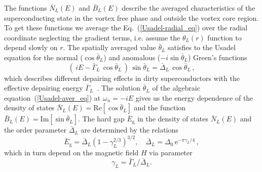 \documentclass[prx,twocolumn,aps,superscriptaddress,showpacs,amsmath,amssymb,footnoteinbib]{revtex4-1}
\begin{document}
The functions $\bar{N}_L(E)$ and $\bar{B}_L(E)$ describe the
averaged characteristics of the superconducting state in the
vortex free phase and outside the vortex core region. To get these
functions we average the Eq.~(\ref{Usadel-radial_eq}) over the
radial coordinate neglecting the gradient terms, i.e. assume the
$\theta_L(r)$ function to depend slowly on $r$. The spatially
averaged value $\bar{\theta}_L$ satisfies to the Usadel equation
for the normal ($\cos\bar{\theta}_L$) and anomalous ($-i
\sin\bar{\theta}_L$) Green's functions~\cite{Maki-SC}
%
\begin{equation}\label{Usadel-aver_eq}
    \left(\,i E - \bar{\Gamma}_L\,\cos\bar{\theta}_L\,
    \right)\,\sin\bar{\theta}_L = \bar{\Delta}_L\, \cos\bar{\theta}_L\,,
\end{equation}
%
which describes different depairing effects in dirty
superconductors with the effective depairing energy
$\bar{\Gamma}_L$~\cite{Anthore-PRL03,eg1,eg2,eg3}. The solution
$\bar{\theta}_L$ of the algebraic equation~(\ref{Usadel-aver_eq})
at $\omega_n = - i E$ gives us the energy dependence of the
density of states $\bar{N}_L(E) = \mathrm{Re}[\cos\bar{\theta}_L]$
and the function $\bar{B}_L(E) = \mathrm{Im}[\sin\bar{\theta}_L]$.
The hard gap $\bar{E}_\mathrm{g}$ in the density of states
$\bar{N}_L(E)$ and the order parameter $\bar{\Delta}_L$ are
determined by the
relations %
%
\begin{equation}\label{Eg-Delta}
    \bar{E}_\mathrm{g} = \bar{\Delta}_L \left( 1 - \gamma_L^{2/3}
    \right)^{3/2}, \quad \bar{\Delta}_L = \Delta_0\, \mathrm{e}^{-\pi \gamma_L
    /4}\,,
\end{equation}
%
which in turn depend on the magnetic field $H$ via parameter
%
\begin{equation}\label{gamma_L}
    \gamma_L = \bar{\Gamma}_L / \bar{\Delta}_L.
\end{equation}
%
\end{document}
